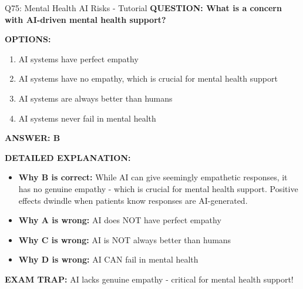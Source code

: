 \documentclass[8pt]{beamer}
\begin{document}
	\begin{frame}{Q75: Mental Health AI Risks - Tutorial}
		\fontsize{6.5}{7.5}\selectfont
		\textbf{QUESTION: What is a concern with AI-driven mental health support?}
		
		\vspace{0.1cm}
		\textbf{OPTIONS:}
		\begin{enumerate}
			\item AI systems have perfect empathy
			\item AI systems have no empathy, which is crucial for mental health support
			\item AI systems are always better than humans
			\item AI systems never fail in mental health
		\end{enumerate}
		
		\vspace{0.1cm}
		\textcolor{myblue}{\textbf{ANSWER: B}}
		
		\vspace{0.1cm}
		\textbf{DETAILED EXPLANATION:}
		\begin{itemize}
			\item \textbf{Why B is correct:} While AI can give seemingly empathetic responses, it has no genuine empathy - which is crucial for mental health support. Positive effects dwindle when patients know responses are AI-generated.
			\item \textbf{Why A is wrong:} AI does NOT have perfect empathy
			\item \textbf{Why C is wrong:} AI is NOT always better than humans
			\item \textbf{Why D is wrong:} AI CAN fail in mental health
		\end{itemize}
		
		\textcolor{myred}{\textbf{EXAM TRAP:}} AI lacks \textcolor{myblue}{genuine empathy} - critical for mental health support!
	\end{frame}
	
	
\end{document}

